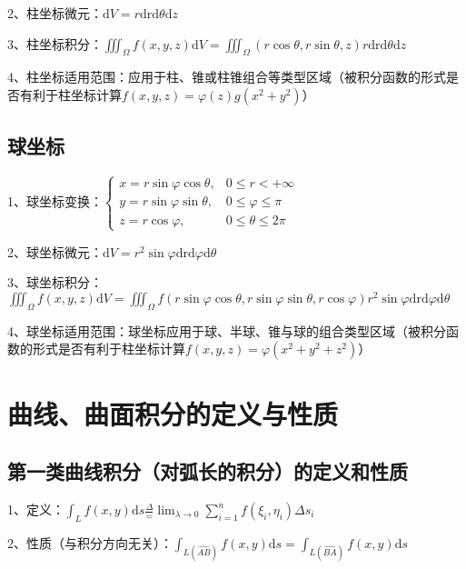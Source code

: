 2、柱坐标微元：$\mathrm{d} V=r \mathrm{drd} \theta \mathrm{d} z$

3、柱坐标积分：$\iiint_{\Omega} f(x, y, z) \mathrm{d} V=\iiint_{\Omega}(r \cos \theta, r \sin \theta, z) r \mathrm{drd} \theta \mathrm{d} z$

4、柱坐标适用范围：应用于柱、锥或柱锥组合等类型区域（被积分函数的形式是否有利于柱坐标计算$f(x, y, z)=\varphi(z) g\left(x^{2}+y^{2}\right)$）



\subsection{球坐标}

1、球坐标变换：$\begin{cases}x=r \sin \varphi \cos \theta, & 0 \leqslant r<+\infty \\ y=r \sin \varphi \sin \theta, & 0 \leqslant \varphi \leqslant \pi \\ z=r \cos \varphi, & 0 \leqslant \theta \leqslant 2 \pi\end{cases}$

2、球坐标微元：$\mathrm{d} V=r^{2} \sin \varphi \mathrm{drd} \varphi \mathrm{d} \theta$

3、球坐标积分：$\iiint_{\Omega} f(x, y, z) \mathrm{d} V=\iiint_{\Omega} f(r \sin \varphi \cos \theta, r \sin \varphi \sin \theta, r \cos \varphi) r^{2} \sin \varphi \mathrm{drd} \varphi \mathrm{d} \theta$

4、球坐标适用范围：球坐标应用于球、半球、锥与球的组合类型区域（被积分函数的形式是否有利于柱坐标计算$f(x, y, z)=\varphi\left(x^{2}+y^{2}+z^{2}\right)$）

\section{曲线、曲面积分的定义与性质}



\subsection{第一类曲线积分（对弧长的积分）的定义和性质}

1、定义：$\int_{L} f(x, y) \mathrm{d} s\frac{\Delta}{=} \lim _{\lambda \rightarrow 0} \sum_{i=1}^{n} f\left(\xi_{i}, \eta_{i}\right) \Delta s_{i}$

2、性质（与积分方向无关）：$\int_{L(\widehat{A B})} f(x, y) \mathrm{d} s=\int_{L(\widehat{B A})} f(x, y) \mathrm{d} s$



